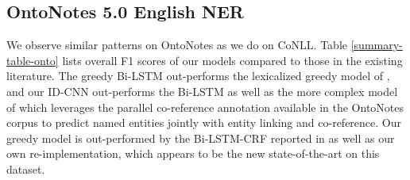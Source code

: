 \subsection{OntoNotes 5.0 English NER}

We observe similar patterns on OntoNotes as we do on CoNLL. Table \ref{summary-table-onto} lists overall F1 scores of our models compared to those in the existing literature. The greedy Bi-LSTM out-performs the lexicalized greedy model of \citet{ratinov2009design}, and our ID-CNN out-performs the Bi-LSTM as well as the more complex model of \citet{durrett2014joint} which leverages the parallel co-reference annotation available in the OntoNotes corpus to predict named entities jointly with entity linking and co-reference. Our greedy model is out-performed by the Bi-LSTM-CRF reported in \citet{chiu2016named} as well as our own re-implementation, which appears to be the new state-of-the-art on this dataset. 

\begin{table}
  \caption{F1 score of sentence and document models on OntoNotes.\label{summary-table-onto}}
\end{table}

